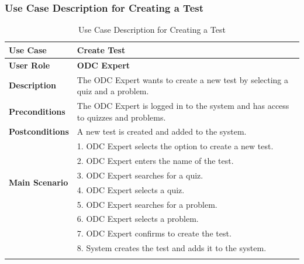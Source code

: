 \subsubsection{Use Case Description for Creating a Test}

\normalsize
\begin{longtable}{|p{3cm}|p{12cm}|}
  \hline
  \rowcolor{green!20} \textbf{Use Case}   & \textbf{Create Test}                                                              \\ \hline
  \textbf{User Role}                      & \textbf{ODC Expert}                                                               \\ \hline
  \textbf{Description}                    & The ODC Expert wants to create a new test by selecting a quiz and a problem.      \\ \hline
  \textbf{Preconditions}                  & The ODC Expert is logged in to the system and has access to quizzes and problems. \\ \hline
  \textbf{Postconditions}                 & A new test is created and added to the system.                                    \\ \hline
  \multirow{6}{*}{\textbf{Main Scenario}} & 1. ODC Expert selects the option to create a new test.                            \\ \cline{2-2}
                                          & 2. ODC Expert enters the name of the test.                                        \\ \cline{2-2}
                                          & 3. ODC Expert searches for a quiz.                                                \\ \cline{2-2}
                                          & 4. ODC Expert selects a quiz.                                                     \\ \cline{2-2}
                                          & 5. ODC Expert searches for a problem.                                             \\ \cline{2-2}
                                          & 6. ODC Expert selects a problem.                                                  \\ \cline{2-2}
                                          & 7. ODC Expert confirms to create the test.                                        \\ \cline{2-2}
                                          & 8. System creates the test and adds it to the system.                             \\ \hline
  \caption{Use Case Description for Creating a Test}\label{tab:create_test_use_case}
\end{longtable}


